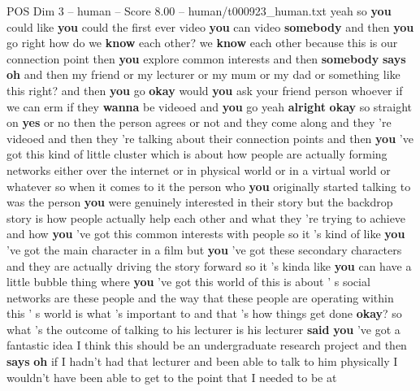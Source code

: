 \begin{textsample}{POS Dim 3 – human – Score 8.00 – human/t000923\_human.txt}  \label{ex:f3_pos_007}
yeah so \textbf{you} could like \textbf{you} could the first ever video \textbf{you} can video \textbf{somebody} and then \textbf{you} go right how do we \textbf{know} each other? we \textbf{know} each other because this is our connection point then \textbf{you} explore common interests and then \textbf{somebody} \textbf{says} \textbf{oh} and then my friend or my lecturer or my mum or my dad or something like this right? and then \textbf{you} go \textbf{okay} would \textbf{you} ask your friend person whoever if we can erm if they \textbf{wanna} be videoed and \textbf{you} go yeah \textbf{alright} \textbf{okay} so straight on \textbf{yes} or no then the person agrees or not and they come along and they 're videoed and then they 're talking about their connection points and then \textbf{you} 've got this kind of little cluster which is about how people are actually forming networks either over the internet or in physical world or in a virtual world or whatever so when it comes to it the person who \textbf{you} originally started talking to was the person \textbf{you} were genuinely interested in their story but the backdrop story is how people actually help each other and what they 're trying to achieve and how \textbf{you} 've got this common interests with people so it 's kind of like \textbf{you} 've got the main character in a film but \textbf{you} 've got these secondary characters and they are actually driving the story forward so it 's kinda like \textbf{you} can have a little bubble thing where \textbf{you} 've got this world of this is about ' s social networks are these people and the way that these people are operating within this ' s world is what 's important to and that 's how things get done \textbf{okay}? so what 's the outcome of talking to his lecturer is his lecturer \textbf{said} \textbf{you} 've got a fantastic idea I think this should be an undergraduate research project and then \textbf{says} \textbf{oh} if I hadn't had that lecturer and been able to talk to him physically I wouldn't have been able to get to the point that I needed to be at

\end{textsample}
